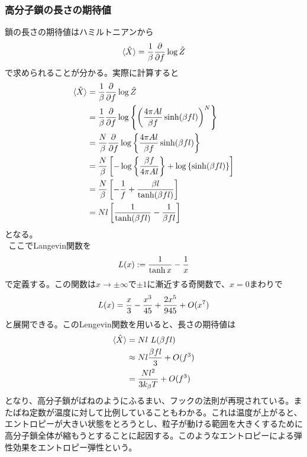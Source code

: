 \documentclass{jsarticle}  %
\numberwithin{equation}{section} %
\numberwithin{figure}{section}
\begin{document}
\subsubsection{高分子鎖の長さの期待値}
    鎖の長さの期待値はハミルトニアンから
    \begin{align}
        \langle \hat{X} \rangle = \frac{1}{\beta} \frac{\partial}{\partial f} \log \tilde{Z} \notag 
    \end{align}
    で求められることが分かる。実際に計算すると
    \begin{align}
        \langle \hat{X} \rangle &= \frac{1}{\beta} \frac{\partial}{\partial f} \log \tilde{Z} \notag \\
        &= \frac{1}{\beta} \frac{\partial}{\partial f} \log \left\{ \left(  \frac{4\pi A l}{\beta f} \sinh (\beta f l) \right)^N \right\} \notag \\
        &= \frac{N}{\beta} \frac{\partial}{\partial f} \log \left\{ \frac{4\pi A l}{\beta f} \sinh (\beta f l) \right\} \notag \\
        &= \frac{N}{\beta} \left[ -\log \left\{ \frac{\beta f}{4\pi A l} \right\} + \log \left\{ \sinh (\beta f l) \right\}\right] \notag \\
        &= \frac{N}{\beta} \left[ -\frac{1}{f} + \frac{\beta l}{\tanh (\beta f l)}\right] \notag \\
        &= Nl \left[ \frac{1}{\tanh (\beta f l)} - \frac{1}{\beta f l}\right] 
    \end{align}
    となる。\\
    $\ \ $ここでLangevin関数を
    \begin{align}
        L(x) := \frac{1}{\tanh x} - \frac{1}{x} \notag 
    \end{align}
    で定義する。この関数は$x \to \pm \infty$で$\pm1$に漸近する奇関数で、$x=0$まわりで
    \begin{align}
        L(x) = \frac{x}{3} - \frac{x^3}{45} + \frac{2x^5}{945} + O(x^7) \notag 
    \end{align}
    と展開できる。このLengevin関数を用いると、長さの期待値は
    \begin{align}
        \langle \hat{X}\rangle &= Nl\ L(\beta f l) \notag \\
        &\approx Nl \frac{\beta f l}{3} + O(f^3)\notag \\
        &= \frac{Nl^2}{3k_\beta T} + O(f^3)
    \end{align}
    となり、高分子鎖がばねのようにふるまい、フックの法則が再現されている。またばね定数が温度に対して比例していることもわかる。これは温度が上がると、エントロピーが大きい状態をとろうとし、粒子が動ける範囲を大きくするために高分子鎖全体が縮もうとすることに起因する。このようなエントロピーによる弾性効果をエントロピー弾性という。
\end{document}
